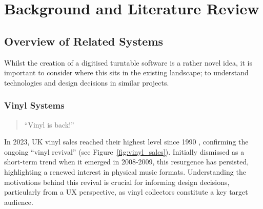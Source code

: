     \section{Background and Literature Review} %
    
      \subsection{Overview of Related Systems}
    
        Whilst the creation of a digitised turntable software is a rather novel idea, it is important to consider where this sits in the existing landscape; to understand technologies and design decisions in similar projects.
      
        \subsubsection{Vinyl Systems}
    
            \begin{quote}
                ``Vinyl is back!'' \cite{bechhofervttspec}
            \end{quote}
            
            In 2023, UK vinyl sales reached their highest level since 1990 \cite{geraghty2023uk_vinyl_sales}, confirming the ongoing ``vinyl revival'' \cite{vinylRevival} (see Figure~\ref{fig:vinyl_sales}). Initially dismissed as a short-term trend when it emerged in 2008-2009, this resurgence has persisted, highlighting a renewed interest in physical music formats. Understanding the motivations behind this revival is crucial for informing design decisions, particularly from a UX perspective, as vinyl collectors constitute a key target audience.
            
